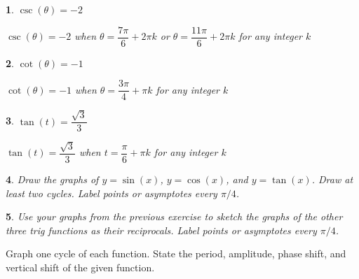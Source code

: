\documentclass{amsbook}
\newtheorem{exc}{}
\newenvironment{ex}{\begin{exc}\normalfont}{\end{exc}}
\numberwithin{section}{chapter}
\numberwithin{equation}{chapter}
\begin{document}
\begin{multicols}{2}
\begin{ex}
 $\csc(\theta) = -2$ 
	\begin{sol}
	 $\csc(\theta) = -2$ when $\theta = \dfrac{7\pi}{6} + 2\pi k$ or $\theta = \dfrac{11\pi}{6} + 2\pi k$ for any integer $k$	
	\end{sol}
\end{ex}

\begin{ex}
	 $\cot(\theta) = -1$
	\begin{sol}
		 $\cot(\theta) = -1$ when $\theta = \dfrac{3\pi}{4} + \pi k$ for any integer $k$
	\end{sol}
\end{ex}

\begin{ex}
	$\tan(t) = \dfrac{\sqrt{3}}{3}$
	\begin{sol}
		 $\tan(t) = \dfrac{\sqrt{3}}{3}$ when $t = \dfrac{\pi}{6} + \pi k$ for any integer $k$
	\end{sol}
\end{ex}



\end{multicols}


\begin{ex}
	Draw the graphs of $y=\sin(x)$, $y=\cos(x)$, and $y=\tan(x)$. Draw at least two cycles. Label points or asymptotes every $\pi/4$.
\end{ex}

\begin{ex}
	Use your graphs from the previous exercise to sketch the graphs of the other three trig functions as their reciprocals.  Label points or asymptotes every $\pi/4$.
\end{ex}

Graph one cycle of each function. State the period, amplitude, phase shift, and vertical shift of the given function.
\end{document}
